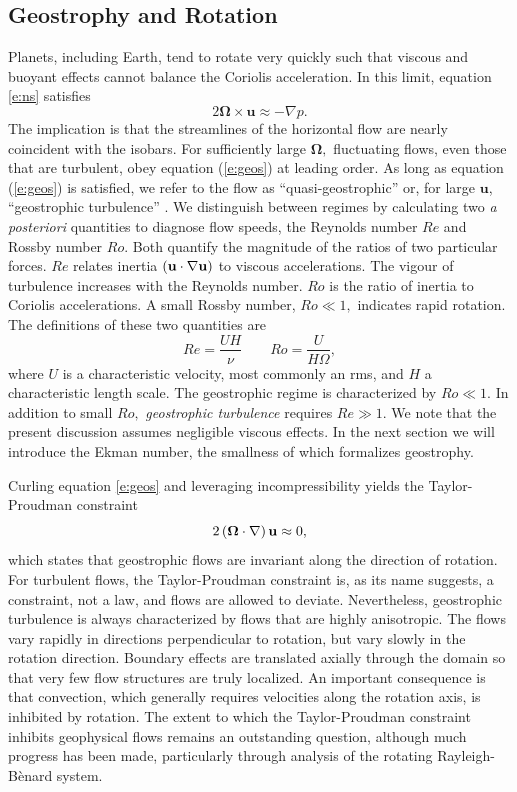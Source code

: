 \subsection{Geostrophy and Rotation} 
Planets, including Earth, tend to rotate very quickly such that viscous and buoyant effects cannot balance the Coriolis acceleration.
In this limit, equation \eqref{e:ns} satisfies
\begin{equation}
	2\mathbf{\Omega}\times \mathbf{u} \approx -\nabla p.
	\label{e:geos}
\end{equation}
The implication is that the streamlines of the horizontal flow are nearly coincident with the isobars. 
For sufficiently large $\mathbf{\Omega},$ fluctuating flows, even those that are turbulent, obey equation (\ref{e:geos}) at leading order. 
As long as equation (\ref{e:geos}) is satisfied, we refer to the flow as ``quasi-geostrophic'' or, for large $\mathbf{u}$, ``geostrophic turbulence'' \citep{jC71}.
We distinguish between regimes by calculating two \textit{a posteriori} quantities to diagnose flow speeds, the Reynolds number $Re$ and Rossby number $Ro.$ 
Both quantify the magnitude of the ratios of two particular forces.
$Re$ relates inertia $\left ( \mathbf{u}\cdot\nabla\mathbf{u}\right ) $ to viscous accelerations. The vigour of turbulence increases with the Reynolds number. $Ro$ is the ratio of inertia to Coriolis accelerations. A small Rossby number, $Ro\ll1,$ indicates rapid rotation.
 The definitions of these two quantities are
 \[Re = \frac{U H}{\nu}\qquad Ro =\frac{U}{H\Omega},\] 
 where $U$ is a characteristic velocity, most commonly an rms, and $H$ a characteristic length scale.
 The geostrophic regime is characterized by $Ro\ll1.$ In addition to small $Ro,$ \textit{geostrophic turbulence} requires $Re\gg1$. We note that the present discussion assumes negligible viscous effects. In the next section we will introduce the Ekman number, the smallness of which formalizes geostrophy.

Curling  equation \eqref{e:geos} and leveraging incompressibility yields the Taylor-Proudman constraint
\begin{equation}
2\left (\mathbf{\Omega}\cdot\nabla\right ) \mathbf{u} \approx 0,
\label{e:tp}
\end{equation}
which states that geostrophic flows are invariant along the direction of rotation. 
For turbulent flows, the Taylor-Proudman constraint is, as its name suggests, a constraint, not a law, and flows are allowed to deviate. 
Nevertheless, geostrophic turbulence is always characterized by flows that are highly anisotropic. 
The flows vary rapidly in directions perpendicular to rotation, but vary slowly in the rotation direction.
Boundary effects are translated axially through the domain so that very few flow structures are truly localized.
An important consequence is that convection, which generally requires velocities along the rotation axis, is inhibited by rotation. 
The extent to which the Taylor-Proudman constraint inhibits geophysical flows remains an outstanding question, although much progress has been made, particularly through analysis of the rotating Rayleigh-B\`enard system.


